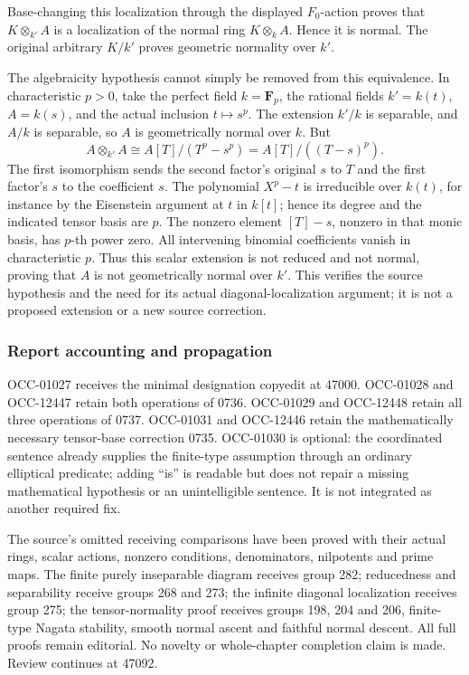 Base-changing this localization through the displayed \(F_0\)-action proves that \(K\otimes_{k'}A\) is a localization of the normal ring \(K\otimes_kA\). Hence it is normal. The original arbitrary \(K/k'\) proves geometric normality over \(k'\).

The algebraicity hypothesis cannot simply be removed from this equivalence. In characteristic \(p>0\), take the perfect field \(k=\mathbf F_p\), the rational fields \(k'=k(t)\), \(A=k(s)\), and the actual inclusion \(t\mapsto s^p\). The extension \(k'/k\) is separable, and \(A/k\) is separable, so \(A\) is geometrically normal over \(k\). But \[
 A\otimes_{k'}A\cong A[T]/(T^p-s^p)
                    =A[T]/((T-s)^p).
\] The first isomorphism sends the second factor's original \(s\) to \(T\) and the first factor's \(s\) to the coefficient \(s\). The polynomial \(X^p-t\) is irreducible over \(k(t)\), for instance by the Eisenstein argument at \(t\) in \(k[t]\); hence its degree and the indicated tensor basis are \(p\). The nonzero element \([T]-s\), nonzero in that monic basis, has \(p\)-th power zero. All intervening binomial coefficients vanish in characteristic \(p\). Thus this scalar extension is not reduced and not normal, proving that \(A\) is not geometrically normal over \(k'\). This verifies the source hypothesis and the need for its actual diagonal-localization argument; it is not a proposed extension or a new source correction.

\subsubsection{Report accounting and propagation}\label{algebra-proof-070-report-accounting-and-propagation}

OCC-01027 receives the minimal designation copyedit at 47000. OCC-01028 and OCC-12447 retain both operations of 0736. OCC-01029 and OCC-12448 retain all three operations of 0737. OCC-01031 and OCC-12446 retain the mathematically necessary tensor-base correction 0735. OCC-01030 is optional: the coordinated sentence already supplies the finite-type assumption through an ordinary elliptical predicate; adding ``is'' is readable but does not repair a missing mathematical hypothesis or an unintelligible sentence. It is not integrated as another required fix.

The source's omitted receiving comparisons have been proved with their actual rings, scalar actions, nonzero conditions, denominators, nilpotents and prime maps. The finite purely inseparable diagram receives group 282; reducedness and separability receive groups 268 and 273; the infinite diagonal localization receives group 275; the tensor-normality proof receives groups 198, 204 and 206, finite-type Nagata stability, smooth normal ascent and faithful normal descent. All full proofs remain editorial. No novelty or whole-chapter completion claim is made. Review continues at 47092.
